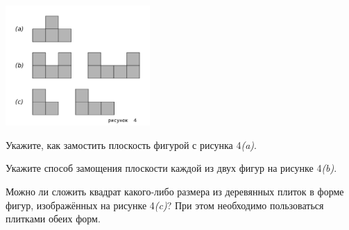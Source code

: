 ﻿
\vspace{-0.7cm}
\centerline{\includegraphics[width=5.5cm]{stats/2018/images/plane-park}}

\begin{enumerate}
\itA Укажите, как замостить плоскость фигурой с рисунка 4{\itshape (a)}.

\itB Укажите способ замощения плоскости каждой из двух фигур на рисунке 4{\itshape (b)}.

\itC Можно ли сложить квадрат какого-либо размера из деревянных плиток в форме фигур, изображённых на рисунке 4{\itshape (c)}? При этом необходимо пользоваться плитками обеих форм.
\end{enumerate}
